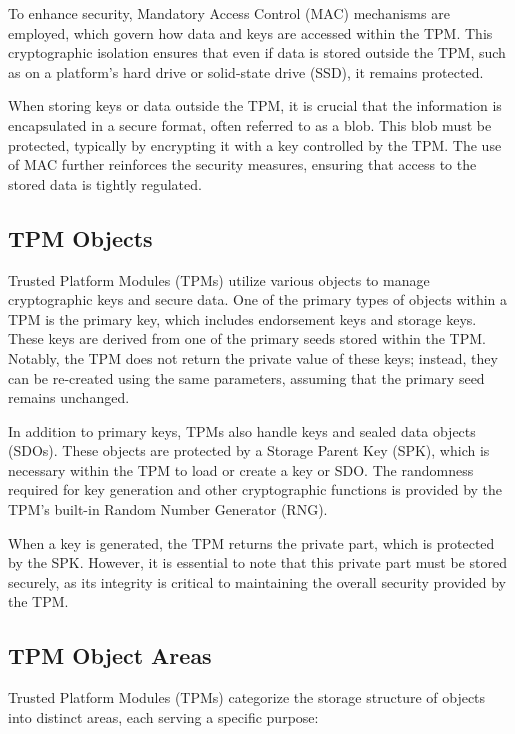 To enhance security, Mandatory Access Control (MAC) mechanisms are
employed, which govern how data and keys are accessed within the TPM.
This cryptographic isolation ensures that even if data is stored
outside the TPM, such as on a platform's hard drive or solid-state
drive (SSD), it remains protected.

When storing keys or data outside the TPM, it is crucial that the
information is encapsulated in a secure format, often referred to as a
blob. This blob must be protected, typically by encrypting it with a
key controlled by the TPM. The use of MAC further reinforces the
security measures, ensuring that access to the stored data is tightly
regulated.

\subsection{TPM Objects}

Trusted Platform Modules (TPMs) utilize various objects to manage
cryptographic keys and secure data. One of the primary types of
objects within a TPM is the primary key, which includes endorsement
keys and storage keys. These keys are derived from one of the primary
seeds stored within the TPM. Notably, the TPM does not return the
private value of these keys; instead, they can be re-created using the
same parameters, assuming that the primary seed remains unchanged.

In addition to primary keys, TPMs also handle keys and sealed data
objects (SDOs). These objects are protected by a Storage Parent Key
(SPK), which is necessary within the TPM to load or create a key or
SDO. The randomness required for key generation and other
cryptographic functions is provided by the TPM's built-in Random
Number Generator (RNG). 

When a key is generated, the TPM returns the private part, which is
protected by the SPK. However, it is essential to note that this
private part must be stored securely, as its integrity is critical to
maintaining the overall security provided by the TPM.

\subsection{TPM Object Areas}

Trusted Platform Modules (TPMs) categorize the storage structure of objects into distinct areas, each serving a specific purpose:

